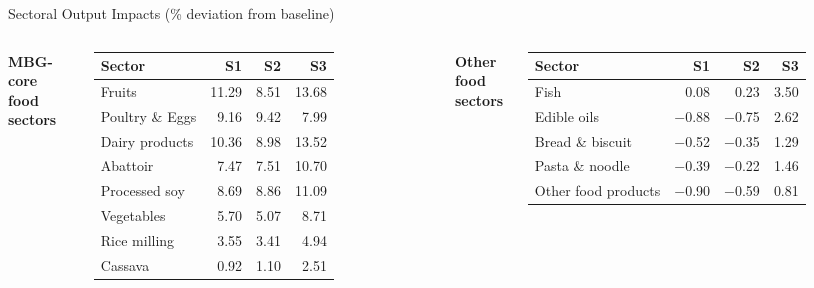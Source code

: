 \documentclass[11pt,aspectratio=169]{beamer}
\begin{document}
\begin{frame}{Sectoral Output Impacts (\% deviation from baseline)}
\scriptsize
\begin{columns}[T,onlytextwidth]
	\centering\textbf{MBG-core food sectors}\\[3pt]
	\begin{tabular}{lrrr}
		\toprule
		\textbf{Sector} & \textbf{S1} & \textbf{S2} & \textbf{S3} \\
		\midrule
		Fruits              &  11.29 &   8.51 &  13.68 \\
		Poultry \& Eggs     &   9.16 &   9.42 &   7.99 \\
		Dairy products      &  10.36 &   8.98 &  13.52 \\
		Abattoir            &   7.47 &   7.51 &  10.70 \\
		Processed soy       &   8.69 &   8.86 &  11.09 \\
		Vegetables          &   5.70 &   5.07 &   8.71 \\
		Rice milling        &   3.55 &   3.41 &   4.94 \\
		Cassava             &   0.92 &   1.10 &   2.51 \\
		\bottomrule
	\end{tabular}
	\centering\textbf{Other food sectors}\\[3pt]
	\begin{tabular}{lrrr}
		\toprule
		\textbf{Sector} & \textbf{S1} & \textbf{S2} & \textbf{S3} \\
		\midrule
		Fish                &   0.08 &   0.23 &   3.50 \\
		Edible oils         & $-$0.88 & $-$0.75 &   2.62 \\
		Bread \& biscuit    & $-$0.52 & $-$0.35 &   1.29 \\
		Pasta \& noodle     & $-$0.39 & $-$0.22 &   1.46 \\
		Other food products & $-$0.90 & $-$0.59 &   0.81 \\
		\bottomrule
	\end{tabular}
	\vspace{8pt}


\end{columns}
\end{frame}
\end{document}
